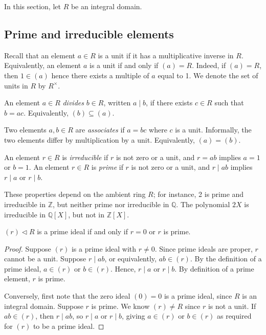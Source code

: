 In this section, let \( R \) be an integral domain.

\subsection{Prime and irreducible elements}
Recall that an element \( a \in R \) is a unit if it has a multiplicative inverse in \( R \).
Equivalently, an element \( a \) is a unit if and only if \( (a) = R \).
Indeed, if \( (a) = R \), then \( 1 \in (a) \) hence there exists a multiple of \( a \) equal to 1.
We denote the set of units in \( R \) by \( R^\times \).
\begin{definition}
    An element \( a \in R \) \textit{divides} \( b \in R \), written \( a \mid b \), if there exists \( c \in R \) such that \( b = ac \).
    Equivalently, \( (b) \subseteq (a) \).

    Two elements \( a, b \in R \) are \textit{associates} if \( a = bc \) where \( c \) is a unit.
    Informally, the two elements differ by multiplication by a unit.
    Equivalently, \( (a) = (b) \).
\end{definition}
\begin{definition}
    An element \( r \in R \) is \textit{irreducible} if \( r \) is not zero or a unit, and \( r = ab \) implies \( a = 1 \) or \( b = 1 \).
    An element \( r \in R \) is \textit{prime} if \( r \) is not zero or a unit, and \( r \mid ab \) implies \( r \mid a \) or \( r \mid b \).
\end{definition}
\begin{remark}
    These properties depend on the ambient ring \( R \); for instance, 2 is prime and irreducible in \( \mathbb Z \), but neither prime nor irreducible in \( \mathbb Q \).
    The polynomial \( 2X \) is irreducible in \( \mathbb Q[X] \), but not in \( \mathbb Z[X] \).
\end{remark}
\begin{lemma}
    \( (r) \triangleleft R \) is a prime ideal if and only if \( r = 0 \) or \( r \) is prime.
\end{lemma}
\begin{proof}
    Suppose \( (r) \) is a prime ideal with \( r \neq 0 \).
    Since prime ideals are proper, \( r \) cannot be a unit.
    Suppose \( r \mid ab \), or equivalently, \( ab \in (r) \).
    By the definition of a prime ideal, \( a \in (r) \) or \( b \in (r) \).
    Hence, \( r \mid a \) or \( r \mid b \).
    By definition of a prime element, \( r \) is prime.

    Conversely, first note that the zero ideal \( (0) = \qty{0} \) is a prime ideal, since \( R \) is an integral domain.
    Suppose \( r \) is prime.
    We know \( (r) \neq R \) since \( r \) is not a unit.
    If \( ab \in (r) \), then \( r \mid ab \), so \( r \mid a \) or \( r \mid b \), giving \( a \in (r) \) or \( b \in (r) \) as required for \( (r) \) to be a prime ideal.
\end{proof}
